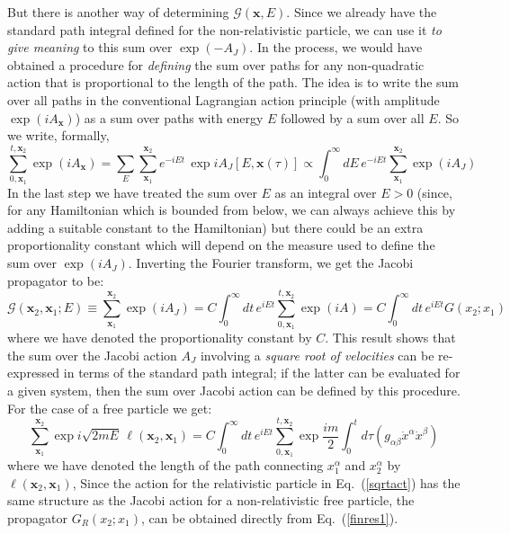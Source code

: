 \documentclass[12pt]{article}
\def\eq#1{{Eq.~(\ref{#1})}}
\begin{document}
 But there is another way of determining $\mathcal{G}(\bm{x},E)$. Since we already have the standard  path integral defined for the  non-relativistic particle, we can use it \textit{to give meaning} to this sum over $\exp(-A_J)$. In the process, we would have obtained a procedure for \textit{defining} the sum over paths for any non-quadratic action that is proportional to the length of  the path. 
The idea is to write the sum over  all paths in the conventional Lagrangian action principle (with amplitude $\exp(iA_{\bm{x}})$) as a sum over paths with energy $E$ followed by a sum over all $E$. So we write, formally, 
\begin{equation}
 \sum_{0,\bm{x}_1}^{t,\bm{x}_2} \exp(iA_{\bm{x}}) = \sum_E \sum_{\bm{x}_1}^{\bm{x}_2} e^{-iEt} \, \exp iA_J[E,\bm{x}(\tau)] \propto \int_0^\infty dE\, e^{-iEt} \sum_{\bm{x}_1}^{\bm{x}_2} \exp(iA_J)
\end{equation} 
In the last step we have treated the sum over $E$ as an integral over $E>0$ (since, for any Hamiltonian which is bounded from below, we can always achieve this by adding a suitable constant to the Hamiltonian) but there could be an extra proportionality constant which will depend on the measure used to define the sum over $\exp(iA_J)$. Inverting the Fourier transform, we get the Jacobi propagator to be: 
\begin{equation}
\mathcal{G}(\bm{x}_2,\bm{x}_1;E) \equiv \sum_{\bm{x}_1}^{\bm{x}_2} \exp(iA_J) = C \int_0^\infty dt \, e^{iEt} \sum_{0,\bm{x}_1}^{t,\bm{x}_2} \exp(iA)
= C \int_0^\infty dt \, e^{iEt} G(x_2;x_1)
\label{pofe}
\end{equation} 
where we have denoted the proportionality constant by $C$. 
 This result shows that the sum over the  Jacobi action $A_J$ involving a \textit{square root of velocities} can be re-expressed in terms of the standard path integral; if the latter can be evaluated for a given system, then the sum over Jacobi action can be defined by this procedure.
 For the case of a free particle we get:
 \begin{equation}
 \sum_{\bm{x}_1}^{\bm{x}_2} \exp i\sqrt{2mE}\, \ell(\bm{x}_2,\bm{x}_1) = C \int_0^\infty dt \, e^{iEt}\sum_{0,\bm{x}_1}^{t,\bm{x}_2}\exp\frac{im}{2} \int_0^t d\tau \left( g_{\alpha\beta} \dot x^\alpha\dot  x^\beta\right)
\label{finres1}
\end{equation} 
where we have denoted the length of the path connecting $x^\alpha_1$ and  $x^\alpha_2$ by $\ell(\bm{x}_2,\bm{x}_1)$, 
Since the action for the relativistic particle in \eq{sqrtact}  has the same structure as the Jacobi action for a non-relativistic free particle, the propagator   $G_R(x_2;x_1)$, can be obtained directly from \eq{finres1}.
\end{document}
